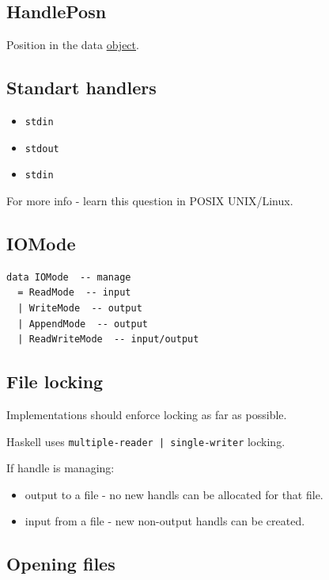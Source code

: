 \documentclass[a4paper,14pt,oneside]{book}
\begin{document}
\subsection{HandlePosn}
\label{sec:org5a3ad7a}

Position in the data \hyperref[orgd191004]{object}.

\subsection{Standart handlers}
\label{sec:org57956d3}

\begin{itemize}
\item \texttt{stdin}
\item \texttt{stdout}
\item \texttt{stdin}
\end{itemize}

For more info - learn this question in POSIX UNIX/Linux.

\subsection{IOMode}
\label{sec:org443c806}

\begin{verbatim}
data IOMode  -- manage
  = ReadMode  -- input
  | WriteMode  -- output
  | AppendMode  -- output
  | ReadWriteMode  -- input/output
\end{verbatim}

\subsection{File locking}
\label{sec:orgc7e327e}

Implementations should enforce locking as far as possible.

Haskell uses \texttt{multiple-reader | single-writer} locking.

If handle is managing:
\begin{itemize}
\item output to a file - no new handls can be allocated for that file.

\item input from a file - new non-output handls can be created.
\end{itemize}

\subsection{Opening files}
\label{sec:orgfdf6a18}
\end{document}
